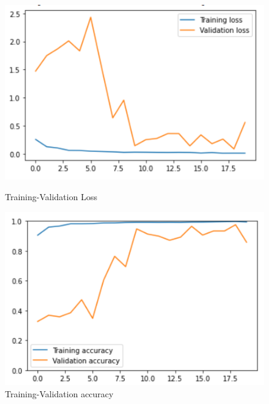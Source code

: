 \documentclass[11pt,a4paper]{article}
\theoremstyle{definition}
\begin{document}
\begin{figure}[H]
  \centering
  \begin{minipage}[b]{0.45\textwidth}
    \includegraphics[scale=0.75]{./images/resnet2loss}
	\caption{Training-Validation Loss}
  \end{minipage}
  \hfill
  \begin{minipage}[b]{0.45\textwidth}
    \includegraphics[scale=0.75]{./images/resnet2acc}
	\caption{Training-Validation accuracy}
  \end{minipage}
\end{figure}
\end{document}
